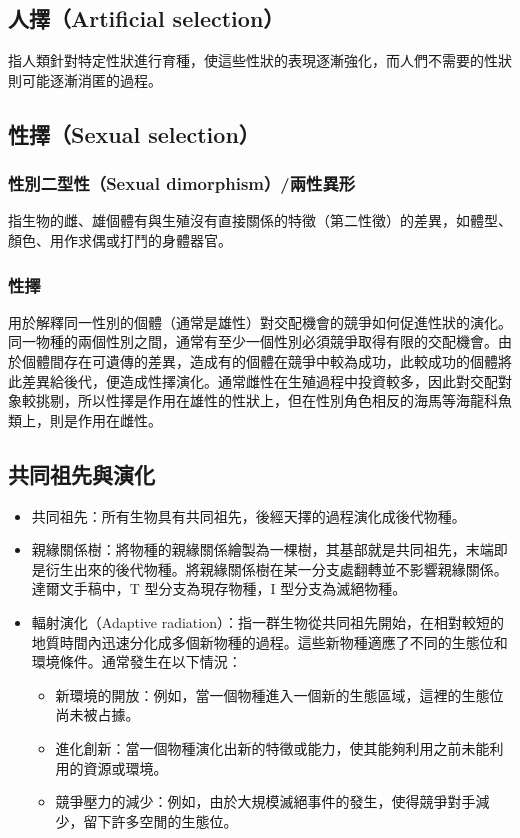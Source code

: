 \documentclass[a4paper,12pt]{report}
\begin{document}
\subsection{人擇（Artificial selection）}
指人類針對特定性狀進行育種，使這些性狀的表現逐漸強化，而人們不需要的性狀則可能逐漸消匿的過程。
\subsection{性擇（Sexual selection）}
\subsubsection{性別二型性（Sexual dimorphism）/兩性異形}
指生物的雌、雄個體有與生殖沒有直接關係的特徵（第二性徵）的差異，如體型、顏色、用作求偶或打鬥的身體器官。
\subsubsection{性擇}
用於解釋同一性別的個體（通常是雄性）對交配機會的競爭如何促進性狀的演化。同一物種的兩個性別之間，通常有至少一個性別必須競爭取得有限的交配機會。由於個體間存在可遺傳的差異，造成有的個體在競爭中較為成功，此較成功的個體將此差異給後代，便造成性擇演化。通常雌性在生殖過程中投資較多，因此對交配對象較挑剔，所以性擇是作用在雄性的性狀上，但在性別角色相反的海馬等海龍科魚類上，則是作用在雌性。
\subsection{共同祖先與演化}
\begin{itemize}
\item 共同祖先：所有生物具有共同祖先，後經天擇的過程演化成後代物種。
\item 親緣關係樹：將物種的親緣關係繪製為一棵樹，其基部就是共同祖先，末端即是衍生出來的後代物種。將親緣關係樹在某一分支處翻轉並不影響親緣關係。達爾文手稿中，T 型分支為現存物種，I 型分支為滅絕物種。
\item 輻射演化（Adaptive radiation）：指一群生物從共同祖先開始，在相對較短的地質時間內迅速分化成多個新物種的過程。這些新物種適應了不同的生態位和環境條件。通常發生在以下情況：
\begin{itemize}
\item 新環境的開放：例如，當一個物種進入一個新的生態區域，這裡的生態位尚未被占據。
\item 進化創新：當一個物種演化出新的特徵或能力，使其能夠利用之前未能利用的資源或環境。
\item 競爭壓力的減少：例如，由於大規模滅絕事件的發生，使得競爭對手減少，留下許多空閒的生態位。
\end{itemize}
\end{itemize}
\end{document}
